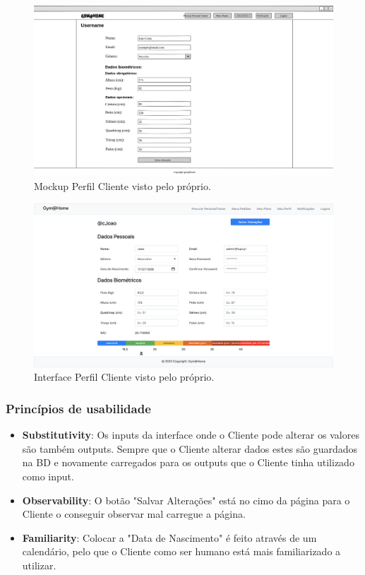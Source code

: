 \begin{figure}[H]
    \centering
    \includegraphics[scale=0.25]{images/mockups/pgina_meu_perfil_cliente.png}
    \caption{Mockup Perfil Cliente visto pelo próprio.}
    \label{fig:mockupperfilclientebycliente}
\end{figure}

\begin{figure}[H]
    \centering
    \includegraphics[scale=0.25]{images/interfaces/client_perfil.png}
    \caption{Interface Perfil Cliente visto pelo próprio.}
    \label{fig:interfaceperfilclientebycliente}
\end{figure}

\subsubsection{Princípios de usabilidade}
\begin{itemize}
   \item \textbf{Substitutivity}: Os inputs da interface onde o Cliente pode alterar os valores são também outputs. Sempre que o Cliente alterar dados estes são guardados na BD e novamente carregados para os outputs que o Cliente tinha utilizado como input.
    
    \item \textbf{Observability}: O botão "Salvar Alterações" está no cimo da página para o Cliente o conseguir observar mal carregue a página.
    
    \item \textbf{Familiarity}: Colocar a "Data de Nascimento" é feito através de um calendário, pelo que o Cliente como ser humano está mais familiarizado a utilizar.
    
\end{itemize}

